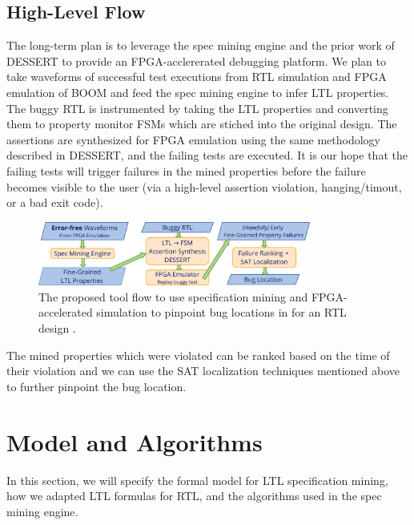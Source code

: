 \documentclass[acmlarge,11pt,nonacm]{acmart}
\begin{document}
\subsection{High-Level Flow}
The long-term plan is to leverage the spec mining engine and the prior work of DESSERT to provide an FPGA-acclererated debugging platform.
We plan to take waveforms of successful test executions from RTL simulation and FPGA emulation of BOOM and feed the spec mining engine to infer LTL properties.
The buggy RTL is instrumented by taking the LTL properties and converting them to property monitor FSMs which are stiched into the original design.
The assertions are synthesized for FPGA emulation using the same methodology described in DESSERT, and the failing tests are executed.
It is our hope that the failing tests will trigger failures in the mined properties before the failure becomes visible to the user (via a high-level assertion violation, hanging/timout, or a bad exit code).
\begin{figure}[H]
  \centering
  \includegraphics[width=0.8\textwidth]{figs/proposed_approach.pdf}
  \caption{The proposed tool flow to use specification mining and FPGA-accelerated simulation to pinpoint bug locations in for an RTL design .}
  \label{fig:proposed_approach}
\end{figure}
The mined properties which were violated can be ranked based on the time of their violation and we can use the SAT localization techniques mentioned above to further pinpoint the bug location.

\section{Model and Algorithms}
In this section, we will specify the formal model for LTL specification mining, how we adapted LTL formulas for RTL, and the algorithms used in the spec mining engine.
\end{document}

